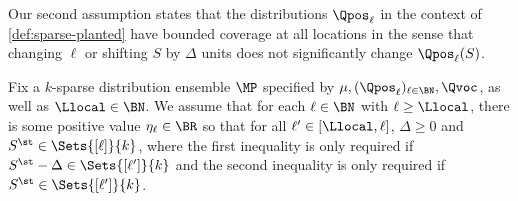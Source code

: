 \documentclass{article}
\newcommand{\arxiv}[1]{\iftoggle{icml}{}{#1}}
\newcommand{\icml}[1]{\iftoggle{icml}{#1}{}}
\begin{document}
Our second assumption states that the distributions $\Qpos_\ell$ in the context of \cref{def:sparse-planted} have bounded coverage at all locations in the sense that changing $\ell$ or shifting $S$ by $\Delta$ units does not significantly change $\Qpos_\ell(S)$. 
\begin{assumption}
  \label{asm:density-ratio-position}
  Fix a $k$-sparse distribution ensemble $\MP$ specified by $\mu, (\Qpos_\ell)_{\ell \in \BN}, \Qvoc$, as well as $\Llocal \in \BN$. 
  We assume that for each $\ell \in \BN$ with $\ell \geq \Llocal$, there is some positive value $\eta_\ell \in \BR$ so that for all $\ell' \in [\Llocal, \ell]$, $\Delta \geq 0$ and $S^\st \in \Sets{[\ell]}{k}$, %
  \arxiv{
  \begin{align}
 \frac{\Qpos_\ell(S^\st)}{\Qpos_{\ell'}(S^\st - \Delta)} \leq \eta_\ell, \qquad  \frac{\Qpos_{\ell'}(S^\st)}{\Qpos_\ell(S^\st)}\leq \eta_\ell\nonumber,
  \end{align}
}
\icml{$\frac{\Qpos_\ell(S^\st)}{\Qpos_{\ell'}(S^\st - \Delta)} \leq \eta_\ell$ and $\frac{\Qpos_{\ell'}(S^\st)}{\Qpos_\ell(S^\st)}\leq \eta_\ell$, } 
  where the first inequality is only required if $S^\st -\Delta \in \Sets{[\ell']}{k}$ and the second inequality is only required if  $S^\st \in \Sets{[\ell']}{k}$. 
\end{assumption}
\arxiv{To help interpret \cref{asm:density-ratio-position}, note first that in order for the distribution ensemble $\MP$ to be  realizable (\cref{asm:unique-selection}) by a class $\Hpred(\Gpred, \Gval)$ satisfying $\Llocal$-locality (\cref{asm:local-relative}), it will typically be the case that $\max_{i \in S^\st} i - \min_{i \in S^\st} i \leq \Llocal$ with probability at least  $1-\delta$ for $S^\st \in \Qpos_\ell$, for any $\ell \in \BN$. Thus, a natural choice for $\Qpos_\ell$ is to fix some distribution $\Qpos_{\Llocal}$ over sets in $\Sets{[\Llocal]}{k}$ and let $\Qpos_\ell$ be the distribution of a random shift of a sample from $\Qpos_{\Llocal}$. Formally, $\Qpos_\ell$ is the distribution of the shift $S + \Delta$, where $S \sim \Qpos_{\Llocal}$ and $\Delta \sim \Unif(\{ 0, 1, \ldots, \ell - \Llocal\})$. It is straightforward to see that such a construction ensures that \cref{asm:density-ratio-position} is satisfied with $\eta_\ell = \ell$. More broadly, any value $\eta_\ell \leq \poly(\ell)$ leads to interesting conclusions in the context of our results, so we interpret \cref{asm:density-ratio-position} as being fairly mild.
  }
\end{document}
